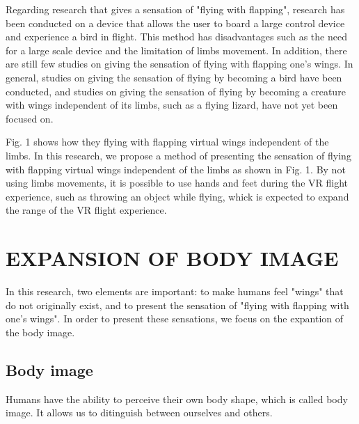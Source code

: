 \documentclass[letterpaper, 10 pt, conference]{ieeeconf}  %
\begin{document}
        Regarding research that gives a sensation of "flying with flapping", research has been conducted on a device that allows the user to board a large control device and experience a bird in flight\cite{rheiner2014birdly}.
        This method has disadvantages such as the need for a large scale device and the limitation of limbs movement.  
        In addition, there are still few studies on giving the sensation of flying with flapping one's wings.  
        In general, studies on giving the sensation of flying by becoming a bird have been conducted, and studies on giving the sensation of flying by becoming a creature with wings independent of its limbs, such as a flying lizard, have not yet been focused on.


        Fig. 1 shows how they flying  with flapping virtual wings independent of the limbs.  
        In this research, we propose a method of presenting the sensation of flying with flapping virtual wings independent of the limbs 
        as shown in Fig. 1.
        By not using limbs movements, it is possible to use hands and feet during the VR flight experience, such as throwing an object while flying, whick is expected to expand the range of the VR flight experience.


\section{EXPANSION OF BODY IMAGE}
        
        In this research, two elements are important: to make humans feel "wings" that do not originally exist, and to present the sensation of "flying with flapping with one's wings".  
        In order to present these sensations, we focus on the expantion of the body image.  

        \subsection{Body image}
                Humans have the ability to perceive their own body shape, which is called body image\cite{head1911sensory}.  
                It allows us to ditinguish between ourselves and others.
\end{document}
